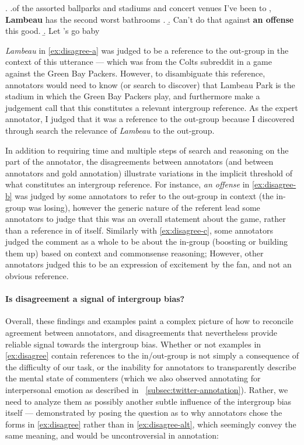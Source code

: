 \ex. \label{ex:disagree} \a.\label{ex:disagree-a}\textellipsis of the assorted ballparks and stadiums and concert venues I've been to , \textbf{Lambeau} has the second worst bathrooms .
    \b. \label{ex:disagree-b} Can’t do that against \textbf{an offense} this good.
    \b. \label{ex:disagree-c} Let ’s go baby

\emph{Lambeau} in \ref{ex:disagree-a} was judged to be a reference to the out-group in the context of this utterance --- which was from the Colts subreddit in a game against the Green Bay Packers. However, to disambiguate this reference, annotators would need to know (or search to discover) that Lambeau Park is the stadium in which the Green Bay Packers play, and furthermore make a judgement call that this constitutes a relevant intergroup reference. As the expert annotator, I judged that it was a reference to the out-group because I discovered through search the relevance of \emph{Lambeau} to the out-group. 

In addition to requiring time and multiple steps of search and reasoning on the part of the annotator, the disagreements between annotators (and between annotators and gold annotation) illustrate variations in the implicit threshold of what constitutes an intergroup reference. For instance, \emph{an offense} in \ref{ex:disagree-b} was judged by some annotators to refer to the out-group in context (the in-group was losing), however the generic nature of the referent lead some annotators to judge that this was an overall statement about the game, rather than a reference in of itself. Similarly with \ref{ex:disagree-c}, some annotators judged the comment as a whole to be about the in-group (boosting or building them up) based on context and commonsense reasoning; However, other annotators judged this to be an expression of excitement by the fan, and not an obvious reference. 

\paragraph{Is disagreement a signal of intergroup bias?} Overall, these findings and examples paint a complex picture of how to reconcile agreement between annotators, and disagreements that nevertheless provide reliable signal towards the intergroup bias. Whether or not examples in \ref{ex:disagree} contain references to the in/out-group is not simply a consequence of the difficulty of our task, or the inability for annotators to transparently describe the mental state of commenters (which we also observed annotating for interpersonal emotion as described in \textsection~\ref{subsec:twitter-annotation}). Rather, we need to analyze them as possibly another subtle influence of the intergroup bias itself --- demonstrated by posing the question as to why annotators chose the forms in \ref{ex:disagree} rather than in \ref{ex:disagree-alt}, which seemingly convey the same meaning, and would be uncontroversial in annotation:

